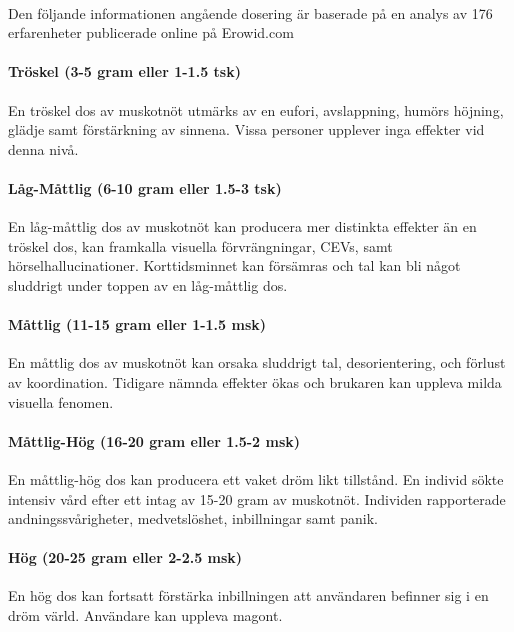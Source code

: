 \\

Den följande informationen angående dosering är baserade på en analys av 176 erfarenheter publicerade online på Erowid.com

\paragraph{Tröskel (3-5 gram eller 1-1.5 tsk)}
En tröskel dos av muskotnöt utmärks av en eufori, avslappning, humörs höjning, glädje samt
förstärkning av sinnena.
Vissa personer upplever inga effekter vid denna nivå.

\paragraph{Låg-Måttlig (6-10 gram eller 1.5-3 tsk)}
En låg-måttlig dos av muskotnöt kan producera mer distinkta effekter än en tröskel dos, kan framkalla visuella förvrängningar, CEVs, samt hörselhallucinationer.
Korttidsminnet kan försämras och tal kan bli något sluddrigt under toppen av en
låg-måttlig dos.

\paragraph{Måttlig (11-15 gram eller 1-1.5 msk)}
En måttlig dos av muskotnöt kan orsaka sluddrigt tal, desorientering, och förlust av koordination. Tidigare nämnda effekter ökas och brukaren kan uppleva milda visuella fenomen.

\paragraph{Måttlig-Hög (16-20 gram eller 1.5-2 msk)}
En måttlig-hög dos kan producera ett vaket dröm likt tillstånd. En individ sökte intensiv vård efter ett intag av 15-20 gram av muskotnöt. Individen rapporterade andningssvårigheter, medvetslöshet, inbillningar samt panik.

\paragraph{Hög (20-25 gram eller 2-2.5 msk)}
En hög dos kan fortsatt förstärka inbillningen att användaren befinner sig i en dröm värld. Användare kan uppleva magont.

